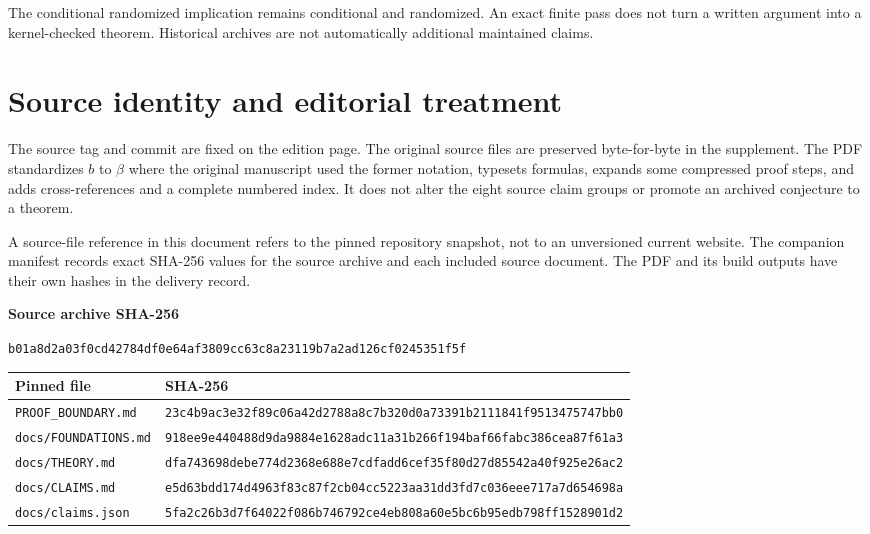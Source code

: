 \documentclass[11pt,letterpaper,oneside]{report}
\theoremstyle{komorebi}
\begin{document}
The conditional randomized implication remains conditional and randomized. An exact finite pass does not turn a written argument into a kernel-checked theorem. Historical archives are not automatically additional maintained claims.

\section{Source identity and editorial treatment}
The source tag and commit are fixed on the edition page. The original source files are preserved byte-for-byte in the supplement. The PDF standardizes $b$ to $\beta$ where the original manuscript used the former notation, typesets formulas, expands some compressed proof steps, and adds cross-references and a complete numbered index. It does not alter the eight source claim groups or promote an archived conjecture to a theorem.

A source-file reference in this document refers to the pinned repository snapshot, not to an unversioned current website. The companion manifest records exact SHA-256 values for the source archive and each included source document. The PDF and its build outputs have their own hashes in the delivery record.

\textbf{Source archive SHA-256}\par
\nolinkurl{b01a8d2a03f0cd42784df0e64af3809cc63c8a23119b7a2ad126cf0245351f5f}

\small
\begin{longtable}{@{}p{1.92in}p{4.30in}@{}}
\toprule
\textbf{Pinned file} & \textbf{SHA-256}\\\midrule\endhead
\nolinkurl{PROOF_BOUNDARY.md} & \nolinkurl{23c4b9ac3e32f89c06a42d2788a8c7b320d0a73391b2111841f9513475747bb0}\\[5pt]
\nolinkurl{docs/FOUNDATIONS.md} & \nolinkurl{918ee9e440488d9da9884e1628adc11a31b266f194baf66fabc386cea87f61a3}\\[5pt]
\nolinkurl{docs/THEORY.md} & \nolinkurl{dfa743698debe774d2368e688e7cdfadd6cef35f80d27d85542a40f925e26ac2}\\[5pt]
\nolinkurl{docs/CLAIMS.md} & \nolinkurl{e5d63bdd174d4963f83c87f2cb04cc5223aa31dd3fd7c036eee717a7d654698a}\\[5pt]
\nolinkurl{docs/claims.json} & \nolinkurl{5fa2c26b3d7f64022f086b746792ce4eb808a60e5bc6b95edb798ff1528901d2}\\[5pt]
\bottomrule
\end{longtable}
\normalsize
\end{document}
